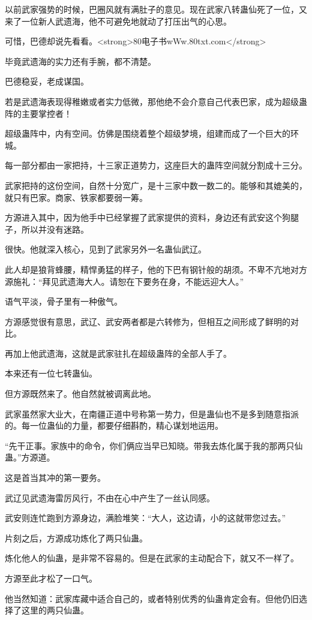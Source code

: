 \begin{this_body}
以前武家强势的时候，巴圈风就有满肚子的意见。现在武家八转蛊仙死了一位，又来了一位新人武遗海，他不可避免地就动了打压出气的心思。

可惜，巴德却说先看看。<strong>80电子书wWw.80txt.com</strong>

毕竟武遗海的实力还有手腕，都不清楚。

巴德稳妥，老成谋国。

若是武遗海表现得稚嫩或者实力低微，那他绝不会介意自己代表巴家，成为超级蛊阵的主要掌控者！

超级蛊阵中，内有空间。仿佛是围绕着整个超级梦境，组建而成了一个巨大的环城。

每一部分都由一家把持，十三家正道势力，这座巨大的蛊阵空间就分割成十三分。

武家把持的这份空间，自然十分宽广，是十三家中数一数二的。能够和其媲美的，就只有巴家。商家、铁家都要弱一筹。

方源进入其中，因为他手中已经掌握了武家提供的资料，身边还有武安这个狗腿子，所以并没有迷路。

很快。他就深入核心，见到了武家另外一名蛊仙武辽。

此人却是狼背蜂腰，精悍勇猛的样子，他的下巴有钢针般的胡须。不卑不亢地对方源施礼：“拜见武遗海大人。请恕在下要务在身，不能远迎大人。”

语气平淡，骨子里有一种傲气。

方源感觉很有意思，武辽、武安两者都是六转修为，但相互之间形成了鲜明的对比。

再加上他武遗海，这就是武家驻扎在超级蛊阵的全部人手了。

本来还有一位七转蛊仙。

但方源既然来了。他自然就被调离此地。

武家虽然家大业大，在南疆正道中号称第一势力，但是蛊仙也不是多到随意指派的。每一位蛊仙的力量，都要仔细斟酌，精心谋划地运用。

“先干正事。家族中的命令，你们俩应当早已知晓。带我去炼化属于我的那两只仙蛊。”方源道。

这是首当其冲的第一要务。

武辽见武遗海雷厉风行，不由在心中产生了一丝认同感。

武安则连忙跑到方源身边，满脸堆笑：“大人，这边请，小的这就带您过去。”

片刻之后，方源成功炼化了两只仙蛊。

炼化他人的仙蛊，是非常不容易的。但是在武家的主动配合下，就又不一样了。

方源至此才松了一口气。

他当然知道：武家库藏中适合自己的，或者特别优秀的仙蛊肯定会有。但他仍旧选择了这里的两只仙蛊。


\end{this_body}
